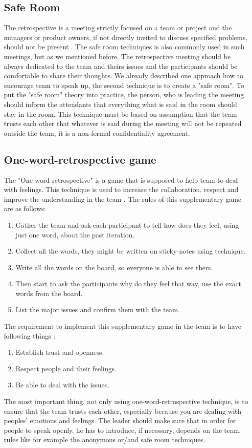 \subsection{Safe Room}
The retrospective is a meeting strictly focused on a team or project and the managers or product owners, if not directly invited to discuss specified problems, should not be present \cite{dosanddonts}. The safe room techniques is also commonly used in such meetings, but as we mentioned before. The retrospective meeting should be always dedicated to the team and theirs issues and the participants should be comfortable to share their thoughts. We already described one approach how to encourage team to speak up, the second technique is to create a "safe room". To put the "safe room" theory into practice, the person, who is leading the meeting should inform the attendants that everything what is said in the room should stay in the room. This technique must be based on assumption that the team trusts each other that whatever is said during the meeting will not be repeated outside the team, it is a non-formal confidentiality agreement. 
\subsection{One-word-retrospective game}
The "One-word-retrospective" is a game that is supposed to help team to deal with feelings. This technique is used to increase the collaboration, respect and improve the understanding in the team \cite{retroBook}. The rules of this supplementary game are as follows:
\begin{enumerate}
    \item Gather the team and ask each participant to tell how does they feel, using just one word, about the past iteration.
    \item Collect all the words, they might be written on sticky-notes using  technique.
    \item Write all the words on the board, so everyone is able to see them.
    \item Then start to ask the participants why do they feel that way, use the exact words from the board.
    \item List the major issues and confirm them with the team.
\end{enumerate}

The requirement to implement this supplementary game in the team is to have following things \cite{retroBook}:
\begin{enumerate}
    \item Establish trust and openness.
    \item Respect people and their feelings.
    \item Be able to deal with the issues.
\end{enumerate}
The most important thing, not only using one-word-retrospective technique, is to ensure that the team trusts each other, especially because you are dealing with peoples' emotions and feelings. The leader should make sure that in order for people to speak openly, he has to introduce, if necessary, depends on the team, rules like for example the anonymous or/and safe room techniques. 
